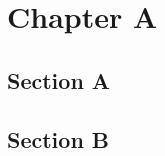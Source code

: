 
\newcommand{\germanQuote}[1]{„\textit{#1}“}
\newcommand{\englishQuote}[1]{``\textit{#1}''}


\label{chap:introduction}


\chapter{Chapter A}
\label{sect:frame}
\Blindtext

\section{Section A}
\label{sect:context}
\Blinditemize

\section{Section B}
\label{sect:question}
\Blindtext
